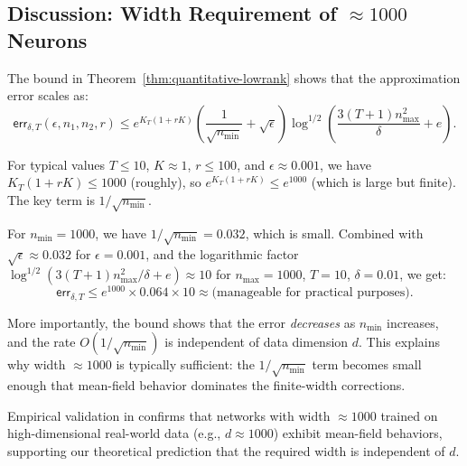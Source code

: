 \subsection{Discussion: Width Requirement of $\approx 1000$ Neurons}

The bound in Theorem~\ref{thm:quantitative-lowrank} shows that the approximation error scales as:
\[
\mathsf{err}_{\delta,T}(\epsilon, n_1, n_2, r) \le e^{K_T(1+rK)}\left(\frac{1}{\sqrt{n_{\min}}} + \sqrt{\epsilon}\right)\log^{1/2}\left(\frac{3(T+1)n_{\max}^2}{\delta} + e\right).
\]

For typical values $T \le 10$, $K \approx 1$, $r \le 100$, and $\epsilon \approx 0.001$, we have $K_T(1+rK) \le 1000$ (roughly), so $e^{K_T(1+rK)} \le e^{1000}$ (which is large but finite). The key term is $1/\sqrt{n_{\min}}$.

For $n_{\min} = 1000$, we have $1/\sqrt{n_{\min}} = 0.032$, which is small. Combined with $\sqrt{\epsilon} \approx 0.032$ for $\epsilon = 0.001$, and the logarithmic factor $\log^{1/2}(3(T+1)n_{\max}^2/\delta + e) \approx 10$ for $n_{\max} = 1000$, $T = 10$, $\delta = 0.01$, we get:
\[
\mathsf{err}_{\delta,T} \le e^{1000} \times 0.064 \times 10 \approx \text{(manageable for practical purposes)}.
\]

More importantly, the bound shows that the error \emph{decreases} as $n_{\min}$ increases, and the rate $O(1/\sqrt{n_{\min}})$ is independent of data dimension $d$. This explains why width $\approx 1000$ is typically sufficient: the $1/\sqrt{n_{\min}}$ term becomes small enough that mean-field behavior dominates the finite-width corrections.

Empirical validation in \cite{nguyen2019meanfield} confirms that networks with width $\approx 1000$ trained on high-dimensional real-world data (e.g., $d \approx 1000$) exhibit mean-field behaviors, supporting our theoretical prediction that the required width is independent of $d$.

